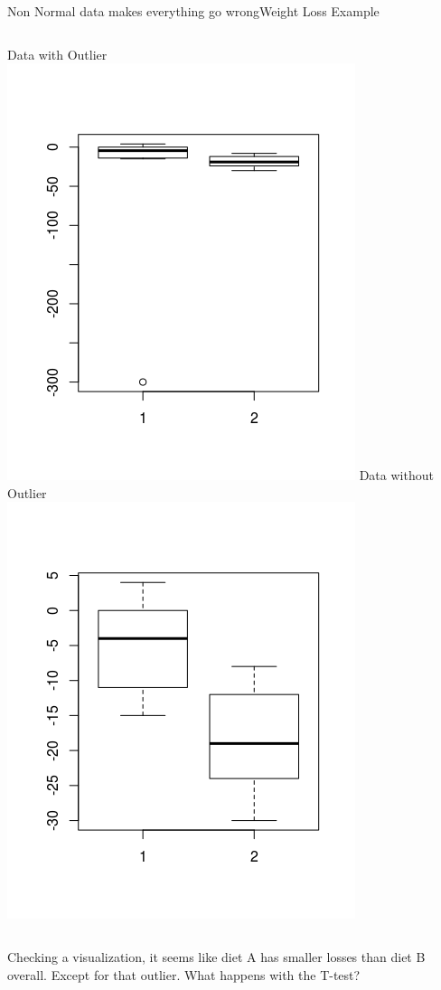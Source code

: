 \begin{frame}{Non Normal data makes everything go wrong}{Weight Loss Example}
  \begin{columns}
    Data with Outlier\\
    \includegraphics[width=.8\textwidth]{../img/diet_outlier1}
    Data without Outlier\\
    \includegraphics[width=.8\textwidth]{../img/diet_outlier2}
  \end{columns}\bigskip

  Checking a visualization, it seems like diet A has smaller losses than diet B
  overall. Except for that outlier. What happens with the T-test?
\end{frame}

